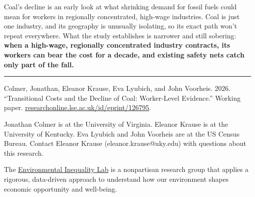 \documentclass[
  11pt,
]{article}
\newenvironment{moreinfo}{%
  \par\vspace{12pt}%
  \noindent\textcolor{warmrule}{\rule{\linewidth}{0.7pt}}\par
  \vspace{7pt}%
  {\color{ink}\bfseries\fontsize{8.25pt}{10pt}\selectfont
   \textls[50]{\MakeUppercase{For more information}}\par}\vspace{4pt}%
  \color{cite}\fontsize{8.4pt}{11.5pt}\selectfont
  \setlength{\parskip}{5pt}%
}{\par}
\begin{document}
\noindent Coal's decline is an early look at what shrinking demand for fossil fuels could mean for workers in regionally concentrated, high-wage industries. Coal is just one industry, and its geography is unusually isolating, so its exact path won't repeat everywhere. What the study establishes is narrower and still sobering: \textbf{when a high-wage, regionally concentrated industry contracts, its workers can bear the cost for a decade, and existing safety nets catch only part of the fall.}

\vspace{8pt}

\begin{moreinfo}
Colmer, Jonathan, Eleanor Krause, Eva Lyubich, and John Voorheis. 2026. ``Transitional Costs and the Decline of Coal: Worker-Level Evidence.'' Working paper. \href{https://researchonline.lse.ac.uk/id/eprint/126795}{\color{cite}\underline{researchonline.lse.ac.uk/id/eprint/126795}}.\par

Jonathan Colmer is at the University of Virginia. Eleanor Krause is at the University of Kentucky. Eva Lyubich and John Voorheis are at the US Census Bureau. Contact Eleanor Krause (eleanor.krause@uky.edu) with questions about this research.\par

The \href{https://www.environmental-inequality-lab.org/}{\color{cite}\underline{Environmental Inequality Lab}} is a nonpartisan research group that applies a rigorous, data-driven approach to understand how our environment shapes economic opportunity and well-being.\par
\end{moreinfo}
\end{document}

